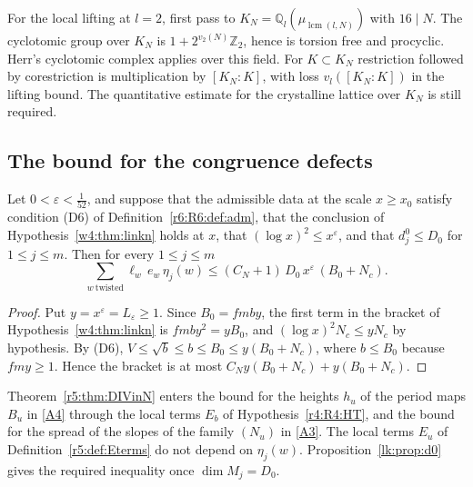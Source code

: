 For the local lifting at $l=2$, first pass to
$K_N=\mathbb Q_l(\mu_{\operatorname{lcm}(l,N)})$ with $16\mid N$.
The cyclotomic group over $K_N$ is $1+2^{v_2(N)}\mathbb Z_2$, hence is
torsion free and procyclic. Herr's cyclotomic complex applies over this
field. For $K\subset K_N$ restriction followed by corestriction is
multiplication by $[K_N:K]$, with loss $v_l([K_N:K])$ in the lifting
bound. The quantitative estimate for the crystalline lattice over $K_N$
is still required.

\subsection{The bound for the congruence defects}\label{tw:sec:divinn}

\begin{theorem}\label{r5:thm:DIVinN}
Let $0<\varepsilon<\frac1{52}$, and suppose that the admissible data at the scale $x\ge x_0$ satisfy condition (D6) of Definition~\ref{r6:R6:def:adm}, that the conclusion of Hypothesis~\ref{w4:thm:linkn} holds at $x$, that $(\log x)^2\le x^\varepsilon$, and that $d^0_j\le D_0$ for $1\le j\le m$. Then for every $1\le j\le m$
\[
\sum_{w\ \mathrm{twisted}}\ell_w\,e_w\,\eta_j(w)\le(C_N+1)\,D_0\,x^{\varepsilon}\,(B_0+N_c).
\]
\end{theorem}

\begin{proof}
Put $y=x^\varepsilon=L_\varepsilon\ge1$. Since $B_0=fmby$, the first term in the bracket of Hypothesis~\ref{w4:thm:linkn} is $fmby^2=yB_0$, and $(\log x)^2N_c\le yN_c$ by hypothesis. By (D6), $V\le\sqrt b\le b\le B_0\le y(B_0+N_c)$, where $b\le B_0$ because $fmy\ge1$. Hence the bracket is at most $C_Ny(B_0+N_c)+y(B_0+N_c)$.
\end{proof}

Theorem~\ref{r5:thm:DIVinN} enters the bound for the heights $h_u$ of the period maps $B_u$ in \eqref{A4} through the local terms $E_b$ of Hypothesis~\ref{r4:R4:HT}, and the bound for the spread of the slopes of the family $(N_u)$ in \eqref{A3}. The local terms $E_u$ of Definition~\ref{r5:def:Eterms} do not depend on $\eta_j(w)$. Proposition~\ref{lk:prop:d0} gives the required inequality once $\dim M_j=D_0$.

